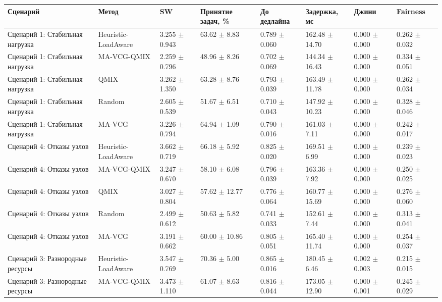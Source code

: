 \begin{tabular}{llllllll}
\toprule
Сценарий & Метод & SW & Принятие задач, \% & До дедлайна & Задержка, мс & Джини & Fairness \\
\midrule
Сценарий 1: Стабильная нагрузка & Heuristic-LoadAware & 3.255 $\pm$ 0.943 & 63.62 $\pm$ 8.83 & 0.789 $\pm$ 0.060 & 162.48 $\pm$ 14.70 & 0.000 $\pm$ 0.000 & 0.262 $\pm$ 0.032 \\
Сценарий 1: Стабильная нагрузка & MA-VCG-QMIX & 2.259 $\pm$ 0.796 & 48.96 $\pm$ 8.26 & 0.702 $\pm$ 0.069 & 144.34 $\pm$ 16.43 & 0.000 $\pm$ 0.000 & 0.334 $\pm$ 0.051 \\
Сценарий 1: Стабильная нагрузка & QMIX & 3.262 $\pm$ 1.350 & 63.28 $\pm$ 8.76 & 0.793 $\pm$ 0.039 & 163.49 $\pm$ 11.78 & 0.000 $\pm$ 0.000 & 0.262 $\pm$ 0.034 \\
Сценарий 1: Стабильная нагрузка & Random & 2.605 $\pm$ 0.539 & 51.67 $\pm$ 6.51 & 0.710 $\pm$ 0.043 & 147.92 $\pm$ 10.23 & 0.000 $\pm$ 0.000 & 0.328 $\pm$ 0.046 \\
Сценарий 1: Стабильная нагрузка & MA-VCG & 3.226 $\pm$ 0.794 & 64.94 $\pm$ 1.09 & 0.790 $\pm$ 0.016 & 161.03 $\pm$ 7.11 & 0.000 $\pm$ 0.000 & 0.242 $\pm$ 0.017 \\
Сценарий 4: Отказы узлов & Heuristic-LoadAware & 3.662 $\pm$ 0.719 & 66.18 $\pm$ 5.92 & 0.825 $\pm$ 0.020 & 169.51 $\pm$ 6.99 & 0.000 $\pm$ 0.000 & 0.239 $\pm$ 0.023 \\
Сценарий 4: Отказы узлов & MA-VCG-QMIX & 3.247 $\pm$ 0.670 & 58.10 $\pm$ 6.08 & 0.796 $\pm$ 0.039 & 163.36 $\pm$ 7.92 & 0.000 $\pm$ 0.000 & 0.250 $\pm$ 0.025 \\
Сценарий 4: Отказы узлов & QMIX & 3.027 $\pm$ 0.804 & 57.62 $\pm$ 12.77 & 0.776 $\pm$ 0.064 & 160.77 $\pm$ 15.69 & 0.000 $\pm$ 0.000 & 0.276 $\pm$ 0.060 \\
Сценарий 4: Отказы узлов & Random & 2.499 $\pm$ 0.612 & 50.63 $\pm$ 5.82 & 0.741 $\pm$ 0.033 & 152.61 $\pm$ 7.44 & 0.000 $\pm$ 0.000 & 0.313 $\pm$ 0.041 \\
Сценарий 4: Отказы узлов & MA-VCG & 3.191 $\pm$ 0.662 & 60.00 $\pm$ 10.86 & 0.805 $\pm$ 0.051 & 165.40 $\pm$ 11.74 & 0.000 $\pm$ 0.000 & 0.254 $\pm$ 0.037 \\
Сценарий 3: Разнородные ресурсы & Heuristic-LoadAware & 3.547 $\pm$ 0.769 & 70.36 $\pm$ 5.00 & 0.865 $\pm$ 0.016 & 180.45 $\pm$ 6.46 & 0.002 $\pm$ 0.003 & 0.215 $\pm$ 0.015 \\
Сценарий 3: Разнородные ресурсы & MA-VCG-QMIX & 3.473 $\pm$ 1.110 & 61.07 $\pm$ 8.63 & 0.816 $\pm$ 0.044 & 173.05 $\pm$ 12.90 & 0.000 $\pm$ 0.001 & 0.245 $\pm$ 0.029 \\

\end{tabular}
